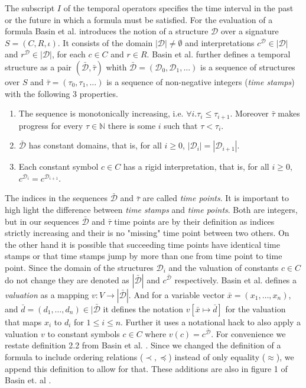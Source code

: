 The subscript $I$ of the temporal operators specifies the time interval in the past or the future in which a formula must be satisfied.
For the evaluation of a formula Basin et al. \cite{Basin2015} introduces the notion of a structure $\mathcal{D}$ over a signature $S=(C,R,\iota)$.
It consists of the domain $| \mathcal{D} | \neq \emptyset$ and interpretations $c^\mathcal{D} \in |\mathcal{D}|$ and $r^\mathcal{D} \in |\mathcal{D}|$, for each $c \in C$ and $r \in R$.
Basin et al. \cite{Basin2015} further defines a temporal structure as a pair $(\bar{\mathcal{D}}, \bar{\tau})$ whith $\bar{\mathcal{D}} = (\mathcal{D}_0, \mathcal{D}_1, \dots)$ is a sequence of structures over $S$ and $\bar{\tau} = (\tau_0, \tau_1, \dots)$ is a sequence of non-negative integers (\textit{time stamps}) with the following 3 properties.
\renewcommand{\labelenumi}{\arabic{enumi}.}
\begin{enumerate}
    \item The sequence is monotonically increasing, i.e. $\forall i . \tau_i \leq \tau_{i+1}$. Moreover $\bar{\tau}$ makes progress for every $\tau \in \mathbb{N}$ there is some $i$ such that $\tau < \tau_i$. 
    \item $\bar{\mathcal{D}}$ has constant domains, that is, for all $i \geq 0$, $|\mathcal{D}_i| = |\mathcal{D}_{i+1}|$.
    \item Each constant symbol $c \in C$ has a rigid interpretation, that is, for all $i \geq 0$, $c^{\mathcal{D}_i} = c^{\mathcal{D}_{i+1}}$.
\end{enumerate}
The indices in the sequences $\bar{\mathcal{D}}$ and $\bar{\tau}$ are called \textit{time points}.
It is important to high light the difference between \textit{time stamps} and \textit{time points}.
Both are integers, but in our sequences $\bar{\mathcal{D}}$ and $\bar{\tau}$ time points are by their definition as indices strictly increasing and their is no "missing" time point between two others.
On the other hand it is possible that succeeding time points have identical time stamps or that time stamps jump by more than one from time point to time point.
Since the domain of the structures $\mathcal{D}_i$ and the valuation of constants $c \in C$ do not change they are denoted as $|\bar{\mathcal{D}}|$ and $c^{\bar{\mathcal{D}}}$ respectively.
Basin et al. defines a \textit{valuation} as a mapping $v : V \to |\bar{\mathcal{D}}|$.
And for a variable vector $\bar{x} = (x_1,\dots,x_n)$, and $\bar{d}=(d_1,\dots,d_n) \in |\bar{\mathcal{D}}$ it defines the notation $v[\bar{x} \mapsto \bar{d}]$ for the valuation that maps $x_i$ to $d_i$ for $1 \leq i \leq n$.
Further it uses a notational hack to also apply a valuation $v$ to constant symbols $c \in C$ where $v(c) = c^{\bar{\mathcal{D}}}$.
For convenience we restate definition 2.2 from Basin et al. \cite{Basin2015}.
Since we changed the definition of a formula to include ordering relations ($\prec, \preceq$) instead of only equality ($\approx$), we append this definition to allow for that.
These additions are also in figure 1 of Basin et. al \cite{Basin2020}.

